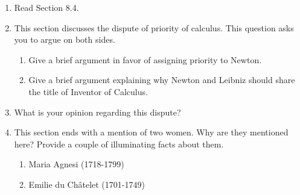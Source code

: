 \documentclass[12pt]{article}
\begin{document}
\begin{enumerate}
\item Read Section 8.4.
\item This section discusses the dispute of priority of calculus. This question asks you to argue on both sides.
	\begin{enumerate}
	\item Give a brief argument in favor of assigning priority to Newton.
	\vfill
	\item Give a brief argument explaining why Newton and Leibniz should share the title of Inventor of Calculus.
	\vfill
	\end{enumerate}
\item What is your opinion regarding this dispute? 
\vfill
\item This section ends with a mention of two women. Why are they mentioned here? Provide a couple of illuminating facts about them.
	\begin{enumerate}
	\item Maria Agnesi (1718-1799)
	\vfill
	\item Emilie du Ch\^atelet (1701-1749)
	\vfill
	\end{enumerate}

\end{enumerate}
\end{document}
